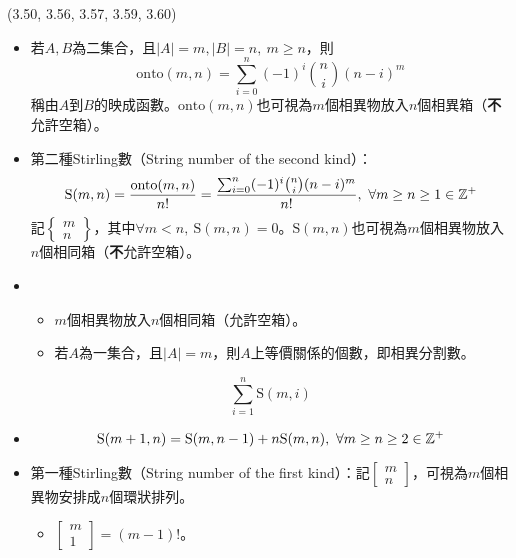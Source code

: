 \item \begin{theorem}{(3.50, 3.56, 3.57, 3.59, 3.60)} \quad\quad
    \begin{itemize}
        \item 若$A, B$為二集合，且$|A| = m, |B| = n, \ m \ge n$，則
        \begin{equation}
            \text{onto}(m, n) = \sum_{i = 0}^{n}(-1)^i\binom{n}{i}(n - i)^m
        \end{equation}
        稱由$A$到$B$的映成函數。$\text{onto}(m, n)$也可視為$m$個相異物放入$n$個相異箱（\textbf{不}允許空箱）。
        \item 第二種Stirling數（String number of the second kind）：\begin{equation}
            \text{S}(m, n) = \frac{\text{onto}(m, n)}{n!} = \frac{\sum_{i = 0}^{n}(-1)^i\binom{n}{i}(n - i)^m}{n!}, \ \forall m \ge n \ge 1 \in \mathbb{Z}^+
        \end{equation}
        記$\left\{\begin{array}{c}m\\n\end{array}\right\}$，其中$\forall m < n, \ \text{S}(m, n) = 0$。$\text{S}(m, n)$也可視為$m$個相異物放入$n$個相同箱（\textbf{不}允許空箱）。
        \item \begin{itemize}
            \item $m$個相異物放入$n$個相同箱（允許空箱）。
            \item 若$A$為一集合，且$|A| = m$，則$A$上等價關係的個數，即相異分割數。
        \end{itemize}
        \begin{equation}
            \sum_{i = 1}^{n} \text{S}(m, i)
        \end{equation}
        \item \begin{equation}
            \text{S}(m + 1, n) = \text{S}(m, n - 1) + n\text{S}(m, n), \ \forall m \ge n \ge 2 \in \mathbb{Z}^+
        \end{equation}
        \item 第一種Stirling數（String number of the first kind）：記$\left[\begin{array}{c}m\\n\end{array}\right]$，可視為$m$個相異物安排成$n$個環狀排列。
        \begin{itemize}
            \item $\left[\begin{array}{c}m\\1\end{array}\right] = (m - 1)!$。

\end{itemize}
\end{itemize}
\end{theorem}
